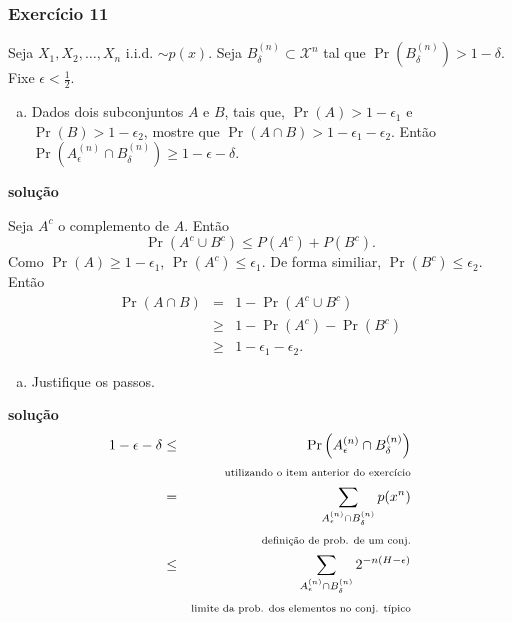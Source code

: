 \begin{frame}[allowframebreaks]
  \frametitle{Exercício 11}
  \begin{exercise}
  Seja $X_1, X_2, \ldots, X_n$ i.i.d. $\sim p(x)$. Seja $B_{\delta}^{(n)} \subset \mathcal{X}^n$ tal que
  $\Pr \left( B_{\delta}^{(n)}  \right) > 1 - \delta$. Fixe $\epsilon < \frac{1}{2}$.

  \begin{enumerate}[a)]
  \item Dados dois subconjuntos $A$ e $B$, tais que, $\Pr(A) > 1 - \epsilon_1$ e $\Pr (B) > 1 - \epsilon_2$,
	mostre que $\Pr(A \cap B) > 1 - \epsilon_1 - \epsilon_2$. Então $\Pr \left( A_{\epsilon}^{(n)} \cap B_{\delta}^{(n)}  \right) \geq 1 - \epsilon - \delta$.
  \end{enumerate}

  \exercisebreak
  \textbf{solução}

  Seja $A^{c}$ o complemento de $A$. Então
  \begin{equation}
  \Pr \left( A^{c} \cup B^{c} \right) \leq P(A^c) + P(B^c) .
  \end{equation}
  Como $\Pr(A) \geq 1 - \epsilon_1$, $\Pr(A^c) \leq \epsilon_1$. De forma similiar, $\Pr(B^c) \leq \epsilon_2$. 
  Então
  \begin{eqnarray}
  \Pr (A \cap B) &=& 1 - \Pr (A^c \cup B^c) \nonumber \\
	&\geq& 1 - \Pr(A^c) - \Pr(B^c) \nonumber \\
	&\geq& 1 - \epsilon_1 - \epsilon_2 .
  \end{eqnarray}

  \exercisebreak
  \begin{enumerate}[b)]
  \item Justifique os passos.
  \end{enumerate}
 
  \textbf{solução}
  \vspace{-0.5cm}
  \begin{eqnarray}
  1 - \epsilon - \delta &\leq& \Pr \left( A_{\epsilon}^{(n)} \cap B_{\delta}^{(n)} \right) \nonumber \\
		&& \text{\scriptsize utilizando o item anterior do exercício} \nonumber \nonumber \\
		&=& \sum_{A_{\epsilon}^{(n)} \cap B_{\delta}^{(n)}} p(x^n) \nonumber \\
		&& \text{\scriptsize definição de prob. de um conj.} \nonumber  \\
		&\leq& \sum_{A_{\epsilon}^{(n)} \cap B_{\delta}^{(n)}} 2^{-n(H-\epsilon)} \\
		&& \text{\scriptsize limite da prob. dos elementos no conj. típico} \nonumber
  \end{eqnarray}
  

\end{exercise}
\end{frame}
